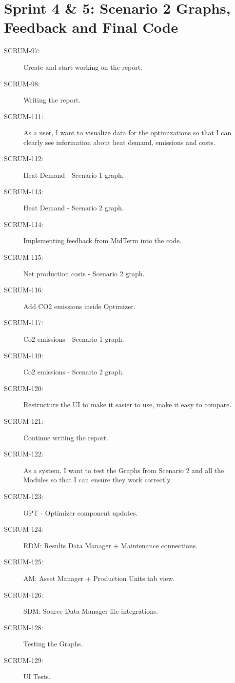 \section*{Sprint 4 \& 5: Scenario 2 Graphs, Feedback and Final Code}
\begin{description}
    \item[SCRUM-97:] Create and start working on the report.
    \item[SCRUM-98:] Writing the report.
    \item[SCRUM-111:] As a user, I want to visualize data for the optimizations so that I can clearly see information about heat demand, emissions and costs.
    \item[SCRUM-112:] Heat Demand - Scenario 1 graph.
    \item[SCRUM-113:] Heat Demand - Scenario 2 graph.
    \item[SCRUM-114:] Implementing feedback from MidTerm into the code.
    \item[SCRUM-115:] Net production costs - Scenario 2 graph.
    \item[SCRUM-116:] Add CO2 emissions inside Optimizer.
    \item[SCRUM-117:] Co2 emissions - Scenario 1 graph.
    \item[SCRUM-119:] Co2 emissions - Scenario 2 graph.
    \item[SCRUM-120:] Restructure the UI to make it easier to use, make it easy to compare.
    \item[SCRUM-121:] Continue writing the report.
    \item[SCRUM-122:] As a system, I want to test the Graphs from Scenario 2 and all the Modules so that I can ensure they work correctly.
    \item[SCRUM-123:] OPT - Optimizer component updates.
    \item[SCRUM-124:] RDM: Results Data Manager + Maintenance connections.
    \item[SCRUM-125:] AM: Asset Manager + Production Units tab view.
    \item[SCRUM-126:] SDM: Source Data Manager file integrations.
    \item[SCRUM-128:] Testing the Graphs.
    \item[SCRUM-129:] UI Tests.
\end{description}